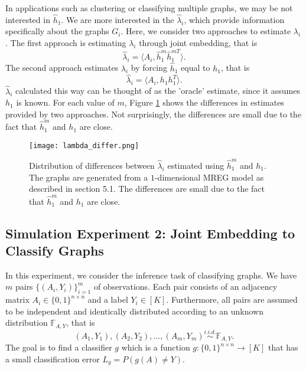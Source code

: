 \documentclass[10pt,journal,compsoc]{IEEEtran}
\begin{document}
\noindent In applications such as clustering or classifying multiple graphs, we may be not interested in $\hat{h}_1$. We are more interested in the $\hat{\lambda}_i$, which provide information specifically about the graphs $G_i$. Here, we consider two approaches to estimate $\lambda_i$. The first approach is estimating $\lambda_i$ through joint embedding, that is
\[ \hat{\lambda}_i = \langle A_i,  \hat{h}^m_1 \hat{h}^{m T}_1 \rangle. \]
The second approach estimates $\lambda_i$ by forcing $\hat{h}_1$ equal to $h_1$, that is 
\[ \hat{\lambda}_i = \langle A_i,  h_1 h_1^T \rangle. \]
$\hat{\lambda}_i$ calculated this way can be thought of as the 'oracle' estimate, since it assumes $h_1$ is known. For each value of $m$, Figure \ref{fig:ld} shows the differences in estimates provided by two approaches. Not surprisingly, the differences are small due to the fact that $\hat{h}_1^m$ and $h_1$ are close.
\begin{figure}[!htbp]
	\centering
	\texttt{[image: lambda\_differ.png]}
	\caption{Distribution of differences between $\hat{\lambda}_i$ estimated using $\hat{h}_1^m$ and $h_1$. The graphs are generated from a $1$-dimensional MREG model as described in section 5.1. The differences are small due to the fact that $\hat{h}_1^m$ and $h_1$ are close.}
	\label{fig:ld}
\end{figure}

\subsection{Simulation Experiment 2: Joint Embedding to Classify Graphs}
In this experiment, we consider the inference task of classifying graphs.  We have $m$ pairs $\{(A_i,Y_i)\}_{i=1}^{m}$ of observations. Each pair consists of an adjacency matrix $A_i \in \{0,1\}^{n \times n}$ and a label $Y_i \in [K]$. Furthermore, all pairs are assumed to be independent and identically distributed according to an unknown distribution $\mathbb{F}_{A,Y}$, that is
\[(A_1,Y_1),(A_2,Y_2),...,(A_m,Y_m) \overset{i.i.d.}{\sim} \mathbb{F}_{A,Y}. \] 
The goal is to find a classifier $g$ which is a function $g:\{0,1\}^{n \times n} \rightarrow [K]$ that has a small classification error $L_g=P(g(A)\neq Y)$. \\ 
\end{document}
